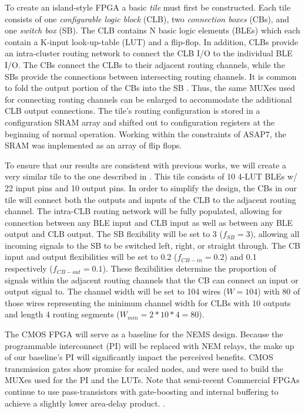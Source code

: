\documentclass[twoside,twocolumn]{article}
\begin{document}
To create an island-style FPGA a basic \textit{tile} must first be constructed. 
Each tile consists of one \textit{configurable logic block} (CLB), 
two \textit{connection boxes} (CBs), and one \textit{switch box} (SB). 
The CLB contains N basic logic elements (BLEs) which each contain a K-input 
look-up-table (LUT) and a flip-flop. In addition, CLBs provide an intra-cluster 
routing network to connect the CLB I/O to the individual BLE I/O. The CBs connect
the CLBs to their adjacent routing channels, while the SBs provide the connections
between intersecting routing channels. It is common to fold the output portion of 
the CBs into the SB \cite{chen_efficient_2010}. Thus, the same MUXes used for
connecting routing channels can be enlarged to accommodate the additional 
CLB output connections. The tile's routing configuration is stored in a configuration SRAM array
and shifted out to configuration registers at the beginning of normal operation. Working within
the constraints of ASAP7, the SRAM was implemented as an array of flip flops.

To ensure that our results are consistent with previous works, we
will create a very similar tile to the one described in \cite{chen_efficient_2010}. 
This tile consists of 10 4-LUT BLEs w/ 22 input pins and 10 output pins.
In order to simplify the design, the CBs in our tile will connect both
the outputs and inputs of the CLB to the adjacent routing channel.
The intra-CLB routing network will be fully populated, allowing for connection 
between any BLE input and CLB input as well as between any BLE output and CLB output.
The SB flexibility will be set to 3 ($f_{SB} = 3$), allowing all 
incoming signals to the SB to be switched left, right, or straight through. 
The CB input and output flexibilities will be set to 0.2 ($f_{CB-in} = 0.2$) 
and 0.1 respectively ($f_{CB-out} = 0.1$). These flexibilities determine the 
proportion of signals within the adjacent routing channels that the CB can 
connect an input or output signal to. The channel width will be set to 104 wires
($W=104$) with 80 of those wires representing the minimum channel width for 
CLBs with 10 outputs and length 4 routing segments ($W_{min} = 2 * 10 * 4 = 80$).

The CMOS FPGA will serve as a baseline for the NEMS design.
Because the programmable interconnect (PI) will be replaced with NEM relays, the make up
of our baseline's PI will significantly impact the perceived benefits. 
CMOS transmission gates show promise for scaled nodes, and were used to build the MUXes used 
for the PI and the LUTs. Note that semi-recent Commercial FPGAs continue to use pass-transistors with gate-boosting and internal buffering
to achieve a slightly lower area-delay product. \cite{chiasson_should_2013}.
\end{document}
